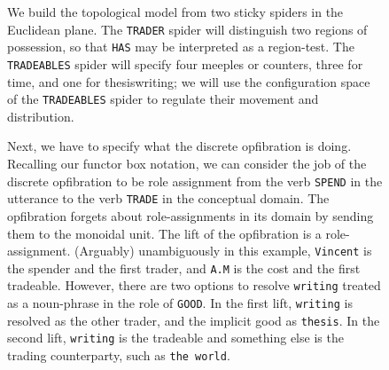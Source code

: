 \begin{example}
\begin{figure}[h]
\end{figure}
\begin{figure}[h]\label{fig:topmodel}
\centering
{}
\caption{We build the topological model from two sticky spiders in the Euclidean plane. The \texttt{TRADER} spider will distinguish two regions of possession, so that \texttt{HAS} may be interpreted as a region-test. The \texttt{TRADEABLES} spider will specify four meeples or counters, three for time, and one for thesiswriting; we will use the configuration space of the \texttt{TRADEABLES} spider to regulate their movement and distribution.}
\end{figure}
\begin{figure}\label{fig:fibroles}
\centering
{}
\caption[-10cm]{Next, we have to specify what the discrete opfibration is doing. Recalling our functor box notation, we can consider the job of the discrete opfibration to be role assignment from the verb \texttt{SPEND} in the utterance to the verb \texttt{TRADE} in the conceptual domain. The opfibration forgets about role-assignments in its domain by sending them to the monoidal unit. The lift of the opfibration is a role-assignment. (Arguably) unambiguously in this example, \texttt{Vincent} is the spender and the first trader, and \texttt{A.M} is the cost and the first tradeable. However, there are two options to resolve \texttt{writing} treated as a noun-phrase in the role of \texttt{GOOD}. In the first lift, \texttt{writing} is resolved as the other trader, and the implicit good as \texttt{thesis}. In the second lift, \texttt{writing} is the tradeable and something else is the trading counterparty, such as \texttt{the world}.}

\end{figure}
\end{example}
